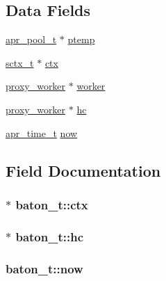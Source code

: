 \subsection*{Data Fields}
\begin{DoxyCompactItemize}
\item 
\hyperlink{structapr__pool__t}{apr\+\_\+pool\+\_\+t} $\ast$ \hyperlink{structbaton__t_aa272172683f3241239a7a4a1280dd1f4}{ptemp}
\item 
\hyperlink{structsctx__t}{sctx\+\_\+t} $\ast$ \hyperlink{structbaton__t_ab345b5d111e8520948f3bfe8b0a24af7}{ctx}
\item 
\hyperlink{structproxy__worker}{proxy\+\_\+worker} $\ast$ \hyperlink{structbaton__t_a391780335821f8e6c475cdba9d21e215}{worker}
\item 
\hyperlink{structproxy__worker}{proxy\+\_\+worker} $\ast$ \hyperlink{structbaton__t_a9e72aa02f76b37f6d1f04719be02a8f0}{hc}
\item 
\hyperlink{group__apr__time_gadb4bde16055748190eae190c55aa02bb}{apr\+\_\+time\+\_\+t} \hyperlink{structbaton__t_a159ee29ce849146e254f228ecad4f2fa}{now}
\end{DoxyCompactItemize}


\subsection{Field Documentation}
\subsubsection[{\texorpdfstring{ctx}{ctx}}]{$\ast$ baton\+\_\+t\+::ctx}\hypertarget{structbaton__t_ab345b5d111e8520948f3bfe8b0a24af7}{}\label{structbaton__t_ab345b5d111e8520948f3bfe8b0a24af7}
\subsubsection[{\texorpdfstring{hc}{hc}}]{$\ast$ baton\+\_\+t\+::hc}\hypertarget{structbaton__t_a9e72aa02f76b37f6d1f04719be02a8f0}{}\label{structbaton__t_a9e72aa02f76b37f6d1f04719be02a8f0}
\subsubsection[{\texorpdfstring{now}{now}}]{ baton\+\_\+t\+::now}\hypertarget{structbaton__t_a159ee29ce849146e254f228ecad4f2fa}{}\label{structbaton__t_a159ee29ce849146e254f228ecad4f2fa}
